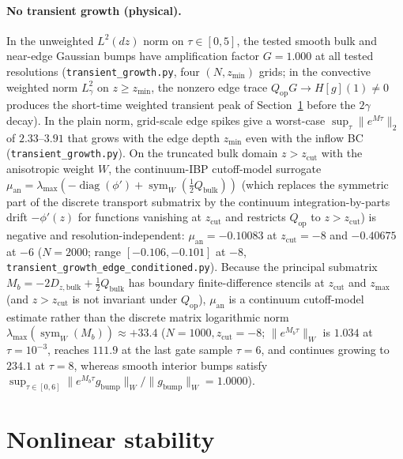 \documentclass[11pt,a4paper]{article}
\begin{document}
\paragraph{No transient growth (physical).}
In the unweighted $L^2(dz)$ norm on $\tau\in[0,5]$, the tested smooth bulk and near-edge Gaussian bumps
have amplification factor $G=1.000$ at all tested resolutions (\texttt{transient\_growth.py}, four
$(N,z_{\min})$ grids; in the convective weighted norm $L^2_\gamma$ on $z\ge z_{\min}$, the nonzero edge
trace $Q_{\mathrm{op}}G\to H[g](1)\ne 0$ produces the short-time weighted transient peak of Section~\ref{sec:nonlin}
before the $2\gamma$ decay).  In the plain norm, grid-scale edge spikes give a worst-case
$\sup_\tau\|e^{M\tau}\|_2$ of $2.33$--$3.91$ that grows with the edge depth $z_{\min}$ even with
the inflow BC (\texttt{transient\_growth.py}).  On the truncated bulk domain $z>z_{\mathrm{cut}}$
with the anisotropic weight $W$, the continuum-IBP cutoff-model surrogate
$\mu_{\mathrm{an}}=\lambda_{\max}(-\operatorname{diag}(\phi')+\operatorname{sym}_W(\tfrac12 Q_{\mathrm{bulk}}))$
(which replaces the symmetric part of the discrete transport submatrix by the continuum
integration-by-parts drift $-\phi'(z)$ for functions vanishing at $z_{\mathrm{cut}}$ and restricts
$Q_{\mathrm{op}}$ to $z>z_{\mathrm{cut}}$) is negative and resolution-independent:
$\mu_{\mathrm{an}}=-0.10083$ at $z_{\mathrm{cut}}=-8$ and $-0.40675$ at $-6$ ($N=2000$; range
$[-0.106,-0.101]$ at $-8$, \texttt{transient\_growth\_edge\_conditioned.py}).
Because the principal submatrix $M_b=-2D_{z,\mathrm{bulk}}+\tfrac12 Q_{\mathrm{bulk}}$ has boundary
finite-difference stencils at $z_{\mathrm{cut}}$ and $z_{\max}$ (and $z>z_{\mathrm{cut}}$ is not invariant under
$Q_{\mathrm{op}}$), $\mu_{\mathrm{an}}$ is a continuum cutoff-model estimate rather than the discrete
matrix logarithmic norm $\lambda_{\max}(\operatorname{sym}_W(M_b))\approx +33.4$ ($N=1000,z_{\mathrm{cut}}=-8$;
$\|e^{M_b\tau}\|_W$ is $1.034$ at $\tau=10^{-3}$, reaches $111.9$ at the last gate sample $\tau=6$, and continues growing
to $234.1$ at $\tau=8$, whereas smooth interior bumps satisfy $\sup_{\tau\in[0,6]}\|e^{M_b\tau}g_{\mathrm{bump}}\|_W/\|g_{\mathrm{bump}}\|_W=1.0000$).

\section{Nonlinear stability}
\label{sec:nonlin}
\end{document}
